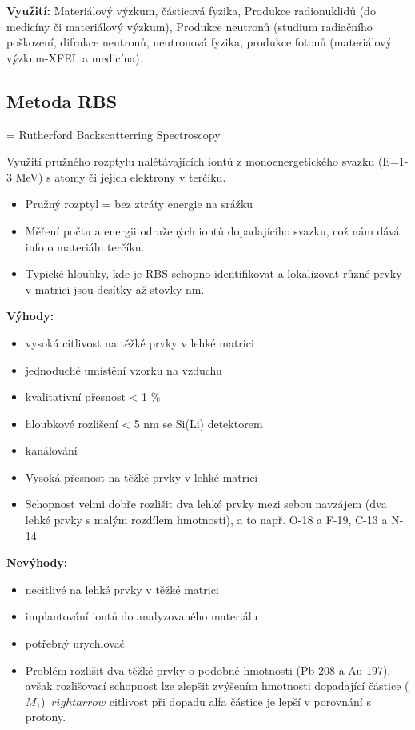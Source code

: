 \textbf{Využití:} Materiálový výzkum, částicová fyzika, Produkce radionuklidů (do medicíny či materiálový výzkum), Produkce neutronů (studium radiačního poškození, difrakce neutronů, neutronová fyzika, produkce fotonů (materiálový výzkum-XFEL a medicína).

\subsection{Metoda RBS}

= Rutherford Backscatterring Spectroscopy

Využití pružného rozptylu nalétávajících iontů z monoenergetického svazku (E=1-3 MeV) s atomy či jejich elektrony v terčíku.

\begin{itemize}
    \item Pružný rozptyl = bez ztráty energie na srážku
    \item Měření počtu a energii odražených iontů dopadajícího svazku, což nám dává info o materiálu terčíku.
    \item Typické hloubky, kde je RBS schopno identifikovat a lokalizovat různé prvky v matrici jsou desítky až stovky nm.
\end{itemize}

\textbf{Výhody:}

\begin{itemize}
\item vysoká citlivost na těžké prvky v lehké matrici
\item jednoduché umístění vzorku na vzduchu
\item kvalitativní přesnost < 1 \%
\item hloubkové rozlišení < 5 nm se Si(Li) detektorem
\item kanálování
\item Vysoká přesnost na těžké prvky v lehké matrici
\item Schopnost velmi dobře rozlišit dva lehké prvky mezi sebou navzájem (dva lehké prvky s malým rozdílem hmotnosti), a to např. O-18 a F-19, C-13 a N-14
\end{itemize}

\textbf{Nevýhody:}

\begin{itemize}
\item necitlivé na lehké prvky v těžké matrici
\item implantování iontů do analyzovaného materiálu
\item potřebný urychlovač
\item Problém rozlišit dva těžké prvky o podobné hmotnosti (Pb-208 a Au-197), avšak rozlišovací schopnost lze zlepšit zvýšením hmotnosti dopadající částice ($M_1$) $~rightarrow$ citlivost při dopadu alfa částice je lepší v porovnání s protony.
\end{itemize}

